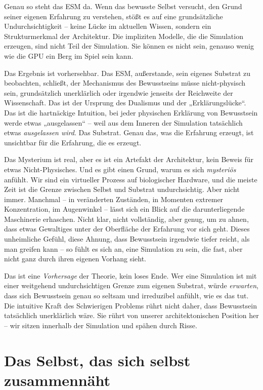 \documentclass[11pt, twoside, openright]{book}
\begin{document}
Genau so steht das ESM da. Wenn das bewusste Selbst versucht, den Grund seiner eigenen Erfahrung zu verstehen, stößt es auf eine grundsätzliche Undurchsichtigkeit -- keine Lücke im aktuellen Wissen, sondern ein Strukturmerkmal der Architektur. Die impliziten Modelle, die die Simulation erzeugen, sind nicht Teil der Simulation. Sie können es nicht sein, genauso wenig wie die GPU ein Berg im Spiel sein kann.

Das Ergebnis ist vorhersehbar. Das ESM, außerstande, sein eigenes Substrat zu beobachten, schließt, der Mechanismus des Bewusstseins müsse nicht-physisch sein, grundsätzlich unerklärlich oder irgendwie jenseits der Reichweite der Wissenschaft. Das ist der Ursprung des Dualismus und der „Erklärungslücke“. Das ist die hartnäckige Intuition, bei jeder physischen Erklärung von Bewusstsein werde etwas „ausgelassen“ -- weil aus dem Inneren der Simulation tatsächlich etwas \textit{ausgelassen wird}. Das Substrat. Genau das, was die Erfahrung erzeugt, ist unsichtbar für die Erfahrung, die es erzeugt.

Das Mysterium ist real, aber es ist ein Artefakt der Architektur, kein Beweis für etwas Nicht-Physisches. Und es gibt einen Grund, warum es sich \textit{mysteriös} anfühlt. Wir sind ein virtueller Prozess auf biologischer Hardware, und die meiste Zeit ist die Grenze zwischen Selbst und Substrat undurchsichtig. Aber nicht immer. Manchmal -- in veränderten Zuständen, in Momenten extremer Konzentration, im Augenwinkel -- lässt sich ein Blick auf die darunterliegende Maschinerie erhaschen. Nicht klar, nicht vollständig, aber genug, um zu ahnen, dass etwas Gewaltiges unter der Oberfläche der Erfahrung vor sich geht. Dieses unheimliche Gefühl, diese Ahnung, dass Bewusstsein irgendwie tiefer reicht, als man greifen kann -- so fühlt es sich an, eine Simulation zu sein, die fast, aber nicht ganz durch ihren eigenen Vorhang sieht.

Das ist eine \textit{Vorhersage} der Theorie, kein loses Ende. Wer eine Simulation ist mit einer weitgehend undurchsichtigen Grenze zum eigenen Substrat, würde \textit{erwarten}, dass sich Bewusstsein genau so seltsam und irreduzibel anfühlt, wie es das tut. Die intuitive Kraft des Schwierigen Problems rührt nicht daher, dass Bewusstsein tatsächlich unerklärlich wäre. Sie rührt von unserer architektonischen Position her -- wir sitzen innerhalb der Simulation und spähen durch Risse.

\section*{Das Selbst, das sich selbst zusammennäht}
\end{document}
